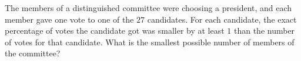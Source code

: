 The members of a distinguished committee were choosing a president, and each member gave one vote to one of the $27$ candidates. For each candidate, the exact percentage of votes the candidate got was smaller by at least $1$ than the number of votes for that candidate. What is the smallest possible number of members of the committee?